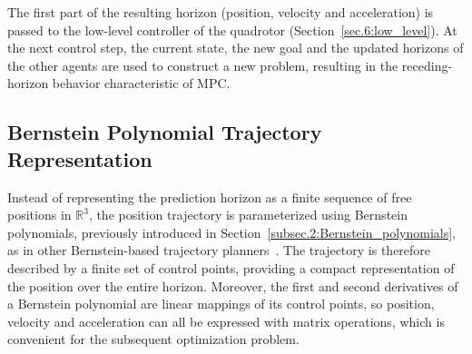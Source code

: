 The first part of the resulting horizon (position, velocity and acceleration) is passed to the low-level controller of the quadrotor (Section~\ref{sec.6:low_level}). At the next control step, the current state, the new goal and the updated horizons of the other agents are used to construct a new problem, resulting in the receding-horizon behavior characteristic of \gls{MPC}.

\subsection{Bernstein Polynomial Trajectory Representation}
\label{subsec:bernstein_trajectory}

Instead of representing the prediction horizon as a finite sequence of free positions in $\mathbb{R}^3$, the position trajectory is parameterized using Bernstein polynomials, previously introduced in Section~\ref{subsec.2:Bernstein_polynomials}, as in other Bernstein-based trajectory planners~\cite{cichella2018,kielasjensen2022,luis2020}. The trajectory is therefore described by a finite set of control points, providing a compact representation of the position over the entire horizon. Moreover, the first and second derivatives of a Bernstein polynomial are linear mappings of its control points, so position, velocity and acceleration can all be expressed with matrix operations, which is convenient for the subsequent optimization problem.

